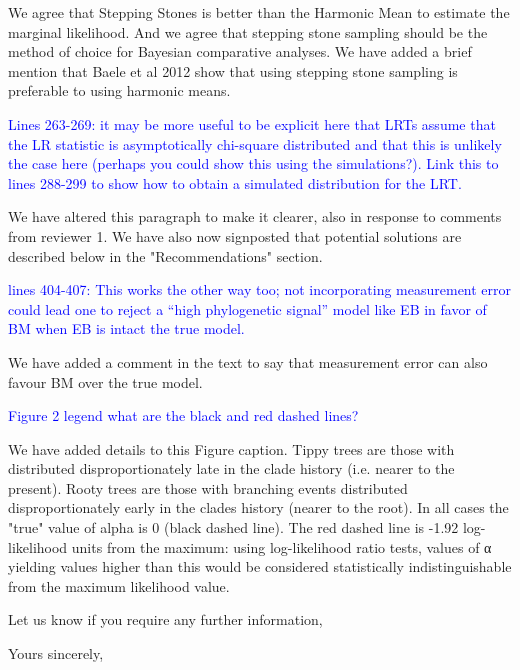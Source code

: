 \documentclass[12pt]{letter}
\begin{document}
\begin{letter}{}
We agree that Stepping Stones is better than the Harmonic Mean to estimate the marginal likelihood. And we agree that stepping stone sampling should be the method of choice for Bayesian comparative analyses. We have added a brief mention that Baele et al 2012 show that using stepping stone sampling is preferable to using harmonic means.

\textcolor{blue}{Lines 263-269: it may be more useful to be explicit here that LRTs assume that the LR statistic is asymptotically chi-square distributed and that this is unlikely the case here (perhaps you could show this using the simulations?). Link this to lines 288-299 to show how to obtain a simulated distribution for the LRT.}

We have altered this paragraph to make it clearer, also in response to comments from reviewer 1. We have also now signposted that potential solutions are described below in the "Recommendations" section.

\textcolor{blue}{lines 404-407: This works the other way too; not incorporating measurement error could lead one to reject a “high phylogenetic signal” model like EB in favor of BM when EB is intact the true model.}

We have added a comment in the text to say that measurement error can also favour BM over the true model.

\textcolor{blue}{Figure 2 legend what are the black and red dashed lines?}

We have added details to this Figure caption. Tippy trees are those with distributed disproportionately late in the clade history (i.e. nearer to the present). Rooty trees are those with branching events distributed disproportionately early in the clades history (nearer to the root). In all cases the "true" value of alpha is 0 (black dashed line). The red dashed line is -1.92 log-likelihood units from the maximum: using log-likelihood ratio tests, values of α yielding values higher than this would be considered statistically indistinguishable from the maximum likelihood value.  

Let us know if you require any further information,

\closing{Yours sincerely,}

\end{letter}
\end{document}
